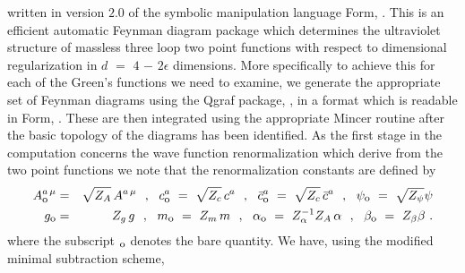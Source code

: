 \documentclass[a4paper,11pt]{article}
\begin{document}
written in version $2.0$ of the symbolic manipulation language {\sc Form}, 
\cite{33,34}. This is an efficient automatic Feynman diagram package which 
determines the ultraviolet structure of massless three loop two point functions
with respect to dimensional regularization in $d$ $=$ $4$ $-$ $2\epsilon$ 
dimensions. More specifically to achieve this for each of the Green's functions
we need to examine, we generate the appropriate set of Feynman diagrams using 
the {\sc Qgraf} package, \cite{35}, in a format which is readable in 
{\sc Form}, \cite{34}. These are then integrated using the appropriate 
{\sc Mincer} routine after the basic topology of the diagrams has been 
identified. As the first stage in the computation concerns the wave function 
renormalization which derive from the two point functions we note that the 
renormalization constants are defined by 
\begin{eqnarray} 
A^{a \, \mu}_{\mbox{\footnotesize{o}}} &=& \sqrt{Z_A} \, A^{a \, \mu} ~~,~~ 
c^a_{\mbox{\footnotesize{o}}} ~=~ \sqrt{Z_c} \, c^a ~~,~~ 
\bar{c}^a_{\mbox{\footnotesize{o}}} ~=~ \sqrt{Z_c} \, \bar{c}^a ~~,~~ 
\psi_{\mbox{\footnotesize{o}}} ~=~ \sqrt{Z_\psi} \psi \nonumber \\ 
g_{\mbox{\footnotesize{o}}} &=& Z_g \, g ~~,~~ m_{\mbox{\footnotesize{o}}} ~=~ 
Z_m \, m ~~,~~ \alpha_{\mbox{\footnotesize{o}}} ~=~ Z^{-1}_\alpha Z_A \, 
\alpha ~~,~~ \beta_{\mbox{\footnotesize{o}}} ~=~ Z_\beta \beta ~.  
\label{Zdef}
\end{eqnarray} 
where the subscript ${}_{\mbox{\footnotesize{o}}}$ denotes the bare quantity.
We have, using the modified minimal subtraction scheme,  
\end{document}
